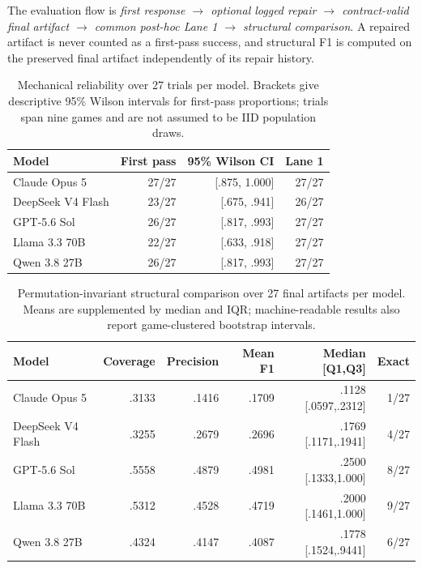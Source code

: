 \documentclass{article}
\begin{document}
The evaluation flow is \emph{first response $\rightarrow$ optional logged repair $\rightarrow$ contract-valid final artifact $\rightarrow$ common post-hoc Lane 1 $\rightarrow$ structural comparison}. A repaired artifact is never counted as a first-pass success, and structural F1 is computed on the preserved final artifact independently of its repair history.

\begin{table}[t]
\centering
\small
\caption{Mechanical reliability over 27 trials per model. Brackets give descriptive 95\% Wilson intervals for first-pass proportions; trials span nine games and are not assumed to be IID population draws.}
\label{tab:main_results}
\begin{tabular}{lrrr}
\toprule
Model & First pass & 95\% Wilson CI & Lane 1 \\
\midrule
Claude Opus 5 & 27/27 & [.875, 1.000] & 27/27 \\
DeepSeek V4 Flash & 23/27 & [.675, .941] & 26/27 \\
GPT-5.6 Sol & 26/27 & [.817, .993] & 27/27 \\
Llama 3.3 70B & 22/27 & [.633, .918] & 27/27 \\
Qwen 3.8 27B & 26/27 & [.817, .993] & 27/27 \\
\bottomrule
\end{tabular}
\end{table}

\begin{table}[t]
\centering
\small
\caption{Permutation-invariant structural comparison over 27 final artifacts per model. Means are supplemented by median and IQR; machine-readable results also report game-clustered bootstrap intervals.}
\label{tab:structural_results}
\begin{tabular}{lrrrrr}
\toprule
Model & Coverage & Precision & Mean F1 & Median [Q1,Q3] & Exact \\
\midrule
Claude Opus 5 & .3133 & .1416 & .1709 & .1128 [.0597,.2312] & 1/27 \\
DeepSeek V4 Flash & .3255 & .2679 & .2696 & .1769 [.1171,.1941] & 4/27 \\
GPT-5.6 Sol & .5558 & .4879 & .4981 & .2500 [.1333,1.000] & 8/27 \\
Llama 3.3 70B & .5312 & .4528 & .4719 & .2000 [.1461,1.000] & 9/27 \\
Qwen 3.8 27B & .4324 & .4147 & .4087 & .1778 [.1524,.9441] & 6/27 \\
\bottomrule
\end{tabular}
\end{table}
\end{document}
